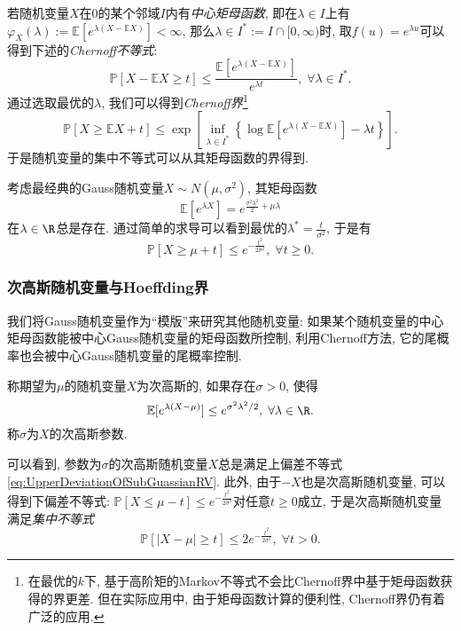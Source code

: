 若随机变量$X$在$0$的某个邻域$I$内有\emph{中心矩母函数}, 即在$\lambda \in I$上有$\varphi_X(\lambda) := \mathbb{E}[e^{\lambda (X - \mathbb{E}X)}] < \infty$, 那么$\lambda \in I^* := I \cap [0, \infty)$时, 取$f(u) = e^{\lambda u}$可以得到下述的\emph{Chernoff不等式}: 
\begin{equation*}
	\mathbb{P}[X - \mathbb{E}X \geq t] 
	\leq \frac{\mathbb{E}[e^{\lambda(X - \mathbb{E}X)}]}{e^{\lambda t}},\;
	\forall \lambda \in I^*.
\end{equation*}
通过选取最优的$\lambda$, 我们可以得到\emph{Chernoff界}\footnote{在最优的$k$下, 基于高阶矩的Markov不等式不会比Chernoff界中基于矩母函数获得的界更差. 但在实际应用中, 由于矩母函数计算的便利性, Chernoff界仍有着广泛的应用.}
\begin{equation*}
	\mathbb{P}[X \geq \mathbb{E}X + t]
	\leq \exp \left[ \inf_{\lambda \in I^*} \left\{ \log \mathbb{E}[e^{\lambda(X - \mathbb{E}X)}] - \lambda t \right\} \right]. 
\end{equation*}
于是随机变量的集中不等式可以从其矩母函数的界得到. 

\begin{example}[Gauss随机变量的上偏差不等式]
	考虑最经典的Gauss随机变量$X \sim N(\mu, \sigma^2)$, 其矩母函数
	\begin{equation}
		\mathbb{E}[e^{\lambda X}] = e^{\frac{\sigma^2 \lambda^2}{2} + \mu \lambda} 		
	\end{equation}
	在$\lambda \in \R$总是存在. 
	通过简单的求导可以看到最优的$\lambda^* = \frac{t}{\sigma^2}$, 于是有
	\begin{equation}\label{eq:UpperDeviationOfSubGuassianRV}
		\mathbb{P}[X \geq \mu + t] \leq e^{- \frac{t^2}{2 \sigma^2}},\; \forall t \geq 0. 
	\end{equation}
\end{example}

\subsubsection{次高斯随机变量与Hoeffding界}

我们将Gauss随机变量作为“模版”来研究其他随机变量: 如果某个随机变量的中心矩母函数能被中心Gauss随机变量的矩母函数所控制, 利用Chernoff方法, 它的尾概率也会被中心Gauss随机变量的尾概率控制. 

\begin{definition}[次高斯随机变量]
	称期望为$\mu$的随机变量$X$为次高斯的, 如果存在$\sigma > 0$, 使得
	\begin{equation*}
		\mathbb{E}[e^{\lambda(X - \mu)}] \leq e^{\sigma^2 \lambda^2 /2},\; \forall \lambda \in \R. 
	\end{equation*}
	称$\sigma$为$X$的次高斯参数. 
\end{definition}
可以看到, 参数为$\sigma$的次高斯随机变量$X$总是满足上偏差不等式 \eqref{eq:UpperDeviationOfSubGuassianRV}.  
此外, 由于$-X$也是次高斯随机变量, 可以得到下偏差不等式: $\mathbb{P}[X \leq \mu - t] \leq e^{- \frac{t^2}{2 \sigma^2}}$对任意$t \geq 0$成立, 于是次高斯随机变量满足\emph{集中不等式}
\begin{equation}\label{eq:SubGuassianConcentration}
	\mathbb{P}[|X - \mu| \geq t] \leq 2 e^{- \frac{t^2}{2 \sigma^2}},\; \forall t > 0. 
\end{equation}


